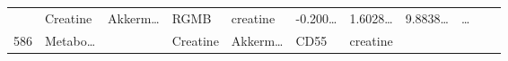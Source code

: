 \documentclass[
]{article}
\begin{document}
\begin{longtable}[]{@{}lllllllllll@{}}
\begin{minipage}[t]{0.07\columnwidth}
\strut
\end{minipage} & \begin{minipage}[t]{0.09\columnwidth}\raggedright
Creatine\strut
\end{minipage} & \begin{minipage}[t]{0.07\columnwidth}\raggedright
Akkerm\ldots{}\strut
\end{minipage} & \begin{minipage}[t]{0.07\columnwidth}\raggedright
RGMB\strut
\end{minipage} & \begin{minipage}[t]{0.09\columnwidth}\raggedright
creatine\strut
\end{minipage} & \begin{minipage}[t]{0.07\columnwidth}\raggedright
-0.200\ldots{}\strut
\end{minipage} & \begin{minipage}[t]{0.07\columnwidth}\raggedright
1.6028\ldots{}\strut
\end{minipage} & \begin{minipage}[t]{0.07\columnwidth}\raggedright
9.8838\ldots{}\strut
\end{minipage} & \begin{minipage}[t]{0.03\columnwidth}\raggedright
\ldots{}\strut
\end{minipage}\tabularnewline
\begin{minipage}[t]{0.03\columnwidth}\raggedright
586\strut
\end{minipage} & \begin{minipage}[t]{0.07\columnwidth}\raggedright
Metabo\ldots{}\strut
\end{minipage} & \begin{minipage}[t]{0.07\columnwidth}\raggedright
\strut
\end{minipage} & \begin{minipage}[t]{0.09\columnwidth}\raggedright
Creatine\strut
\end{minipage} & \begin{minipage}[t]{0.07\columnwidth}\raggedright
Akkerm\ldots{}\strut
\end{minipage} & \begin{minipage}[t]{0.07\columnwidth}\raggedright
CD55\strut
\end{minipage} & \begin{minipage}[t]{0.09\columnwidth}\raggedright
creatine\strut
\end{minipage} & \begin{minipage}[t]{0.07\columnwidth}\raggedright

\end{minipage}
\end{longtable}
\end{document}
